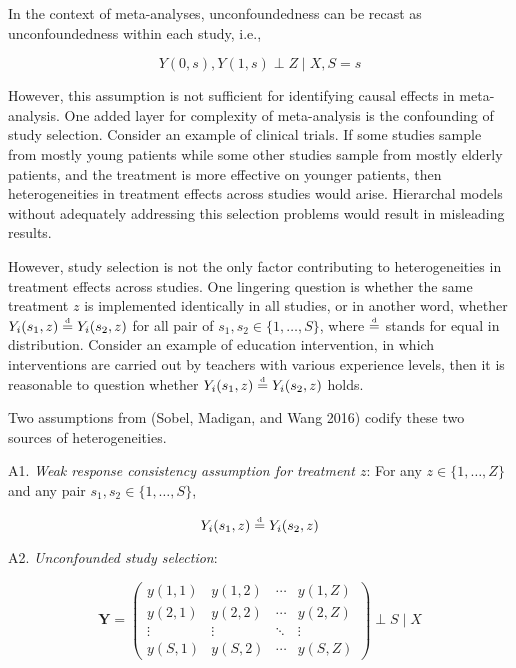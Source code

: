 In the context of meta-analyses, unconfoundedness can be recast as
unconfoundedness within each study, i.e.,

\begin{equation*}
    Y(0, s),Y(1, s) \perp Z \mid X, S=s
\end{equation*}

However, this assumption is not sufficient for identifying causal
effects in meta-analysis. One added layer for complexity of
meta-analysis is the confounding of study selection. Consider an example
of clinical trials. If some studies sample from mostly young patients
while some other studies sample from mostly elderly patients, and the
treatment is more effective on younger patients, then heterogeneities in
treatment effects across studies would arise. Hierarchal models without
adequately addressing this selection problems would result in misleading
results.

However, study selection is not the only factor contributing to
heterogeneities in treatment effects across studies. One lingering
question is whether the same treatment \(z\) is implemented identically
in all studies, or in another word, whether
\(Y_i(s_1, z)\disteq Y_i(s_2, z)\) for all pair of
\(s_1, s_2 \in \{1,\dots, S\}\), where \(\disteq\) stands for equal in
distribution. Consider an example of education intervention, in which
interventions are carried out by teachers with various experience
levels, then it is reasonable to question whether
\(Y_i(s_1, z)\disteq Y_i(s_2, z)\) holds.

Two assumptions from (Sobel, Madigan, and Wang 2016) codify these two
sources of heterogeneities.

A1. \emph{Weak response consistency assumption for treatment \(z\)}: For
any \(z\in\{1,\dots,Z\}\) and any pair \(s_1, s_2\in\{1,\ldots,S\}\),

\begin{equation*}
Y_i(s_1, z)\disteq Y_i(s_2, z)
\end{equation*}

A2. \emph{Unconfounded study selection}:

\begin{equation*}\bm Y=
\begin{pmatrix}
y(1,1) & y(1,2) & \cdots & y(1,Z)\\
y(2,1) & y(2,2) & \cdots & y(2,Z)\\
\vdots & \vdots & \ddots & \vdots\\
y(S,1) & y(S,2) & \cdots & y(S,Z)
\end{pmatrix}
 \perp S \mid X\end{equation*}

